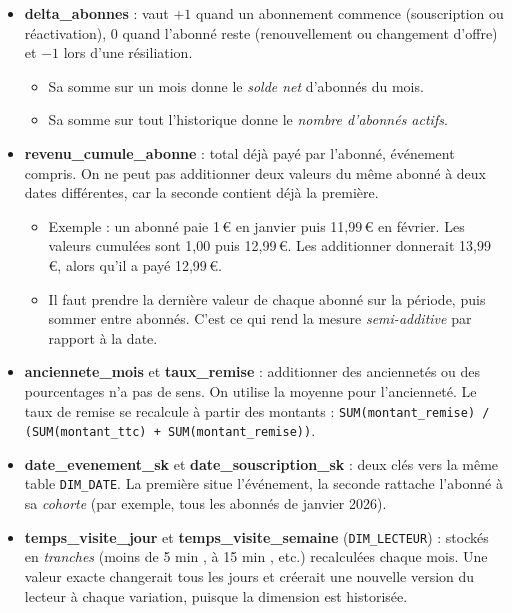 \documentclass[a4paper,12pt]{article}
\begin{document}
\begin{itemize}

  \item \textbf{delta\_abonnes} : vaut $+1$ quand un abonnement commence
  (souscription ou réactivation), $0$ quand l'abonné reste (renouvellement ou
  changement d'offre) et $-1$ lors d'une résiliation.
  \begin{itemize}
    \item Sa somme sur un mois donne le \emph{solde net} d'abonnés du mois.
    \item Sa somme sur tout l'historique donne le \emph{nombre d'abonnés actifs}.
  \end{itemize}

  \item \textbf{revenu\_cumule\_abonne} : total déjà payé par l'abonné,
  événement compris. On ne peut pas additionner deux valeurs du même abonné
  à deux dates différentes, car la seconde contient déjà la première.
  \begin{itemize}
    \item Exemple : un abonné paie 1\,€ en janvier puis 11,99\,€ en février.
          Les valeurs cumulées sont 1,00 puis 12,99\,€. Les additionner
          donnerait 13,99\,€, alors qu'il a payé 12,99\,€.
    \item Il faut prendre la dernière valeur de chaque abonné sur la période,
          puis sommer entre abonnés. C'est ce qui rend la mesure
          \emph{semi-additive} par rapport à la date.
  \end{itemize}

  \item \textbf{anciennete\_mois} et \textbf{taux\_remise} : additionner des
  anciennetés ou des pourcentages n'a pas de sens. On utilise la moyenne pour
  l'ancienneté. Le taux de remise se recalcule à partir des montants :
  \texttt{SUM(montant\_remise) / (SUM(montant\_ttc) + SUM(montant\_remise))}.

  \item \textbf{date\_evenement\_sk} et \textbf{date\_souscription\_sk} :
  deux clés vers la même table \texttt{DIM\_DATE}. La première situe
  l'événement, la seconde rattache l'abonné à sa \emph{cohorte}
  (par exemple, tous les abonnés de janvier 2026).

  \item \textbf{temps\_visite\_jour} et \textbf{temps\_visite\_semaine}
  (\texttt{DIM\_LECTEUR}) : stockés en \emph{tranches} (\og moins de 5 min \fg,
   à 15 min \fg, etc.) recalculées chaque mois. Une valeur exacte
  changerait tous les jours et créerait une nouvelle version du lecteur à
  chaque variation, puisque la dimension est historisée.


\end{itemize}
\end{document}
